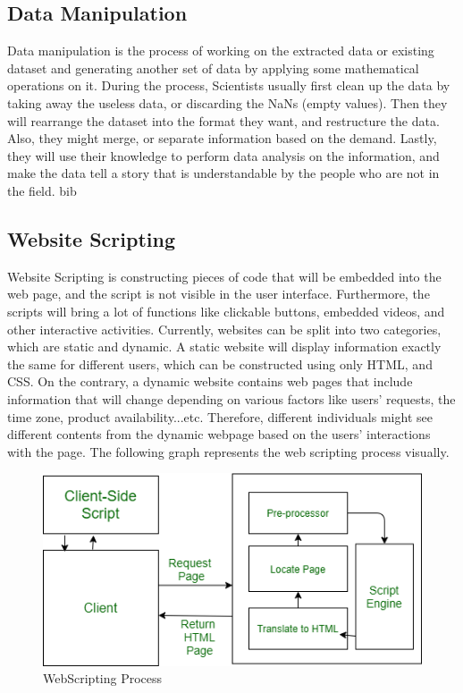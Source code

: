 \documentclass[10pt,twocolumn]{article}
\begin{document}
\subsection{Data Manipulation}
Data manipulation is the process of working on the extracted data or existing dataset and generating another set of data by applying some mathematical operations on it. During the process, Scientists usually first clean up the data by taking away the useless data, or discarding the NaNs (empty values). Then they will rearrange the dataset into the format they want, and restructure the data. Also, they might merge, or separate information based on the demand\cite{Eads2021}. Lastly, they will use their knowledge to perform data analysis on the information, and make the data tell a story that is understandable by the people who are not in the field. 
\newline
\indent
bib

\subsection{Website Scripting}
Website Scripting is constructing pieces of code that will be embedded into the web page, and the script is not visible in the user interface. Furthermore, the scripts will bring a lot of functions like clickable buttons, embedded videos, and other interactive activities. Currently, websites can be split into two categories, which are static and dynamic. A static website will display information exactly the same for different users, which can be constructed using only HTML, and CSS. On the contrary, a dynamic website contains web pages that include information that will change depending on various factors like users' requests, the time zone, product availability...etc. Therefore, different individuals might see different contents from the dynamic webpage based on the users' interactions with the page. The following graph represents the web scripting process visually.
\begin{figure}[h!]
    \centering
    \includegraphics[width=.95\linewidth]{WebScripting.png}
    \small
    \caption{WebScripting Process}   
\end{figure}
\end{document}
